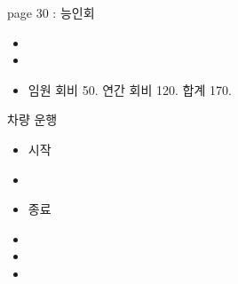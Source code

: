 \documentclass[aspectratio=1610,17pt,xcolor=pdftex,dvipsnames,table,handout]{beamer}
\begin{document}
		\begin{frame} [t,plain]

			\begin{block} { page 30 : 능인회  }

			\begin{itemize}
			\item 	
			\item 	
			\item 	임원 회비 50.  연간 회비 120.  합계 170.
			\end{itemize}
			\end{block}			

								
		\end{frame}	 %





		\begin{frame} [t,plain]

			\begin{block} { 차량 운행 }
			\setlength{\leftmargini}{3em}			
		\begin{large}

			\begin{itemize}
			\item 	시작 
			\item 	
			\item 	종료 
			\item 	
			\item 	
			\item 	
			\end{itemize}
		\end{large}

			\end{block}			
								
		\end{frame}	 %
\end{document}
